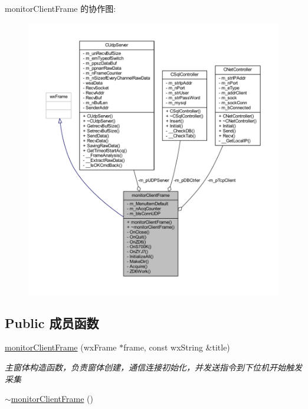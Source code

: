 monitor\+Client\+Frame 的协作图\+:\nopagebreak
\begin{figure}[H]
\begin{center}
\leavevmode
\includegraphics[width=350pt]{classmonitor_client_frame__coll__graph}
\end{center}
\end{figure}
\subsection*{Public 成员函数}
\begin{DoxyCompactItemize}
\item 
\hyperlink{classmonitor_client_frame_ae98aa8b084a50fa578e1a648d125a85b}{monitor\+Client\+Frame} (wx\+Frame $\ast$frame, const wx\+String \&title)
\begin{DoxyCompactList}\small\item\em 主窗体构造函数，负责窗体创建，通信连接初始化，并发送指令到下位机开始触发采集 \end{DoxyCompactList}\item 
\hyperlink{classmonitor_client_frame_a2cae380d4d48325c2c9de20e67efc74a}{$\sim$monitor\+Client\+Frame} ()
\end{DoxyCompactItemize}

